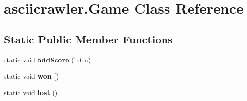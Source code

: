 \hypertarget{classasciicrawler_1_1Game}{}\section{asciicrawler.\+Game Class Reference}
\label{classasciicrawler_1_1Game}
\subsection*{Static Public Member Functions}
\begin{DoxyCompactItemize}
\item 
\mbox{\label{classasciicrawler_1_1Game_a710127c5e068bab243b8ae11b94eaf7e}} 
static void {\bfseries add\+Score} (int n)
\item 
\mbox{\label{classasciicrawler_1_1Game_a3b40e9fa0de37e53daaaaf66d073f027}} 
static void {\bfseries won} ()
\item 
\mbox{\label{classasciicrawler_1_1Game_a8158267fd8ae418c716d9b4a12ab5881}} 
static void {\bfseries lost} ()
\end{DoxyCompactItemize}
